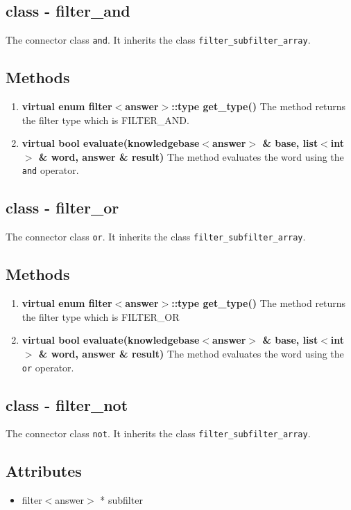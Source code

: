 \subsection{class - filter\_and}
The connector class \texttt{and}. It inherits the class \texttt{filter\_subfilter\_array}. 
\subsection*{Methods}
\begin{enumerate}
 \item \textbf{virtual enum filter$<$answer$>$::type get\_type()}
	The method returns the filter type which is FILTER\_AND.
 \item \textbf{virtual bool evaluate(knowledgebase$<$answer$>$ \& base, list$<$int$>$ \& word, answer \& result)}
	The method evaluates the word using the \texttt{and} operator.
\end{enumerate}

\subsection{class - filter\_or}
The connector class \texttt{or}. It inherits the class \texttt{filter\_subfilter\_array}. 
\subsection*{Methods}
\begin{enumerate}
 \item \textbf{virtual enum filter$<$answer$>$::type get\_type()}
	The method returns the filter type which is FILTER\_OR
 \item \textbf{virtual bool evaluate(knowledgebase$<$answer$>$ \& base, list$<$int$>$ \& word, answer \& result)}
	The method evaluates the word using the \texttt{or} operator.
\end{enumerate}

\subsection{class - filter\_not}
The connector class \texttt{not}. It inherits the class \texttt{filter\_subfilter\_array}. 
\subsection*{Attributes}
\begin{itemize}
 \item filter$<$answer$>$ * subfilter \\
\end{itemize}
